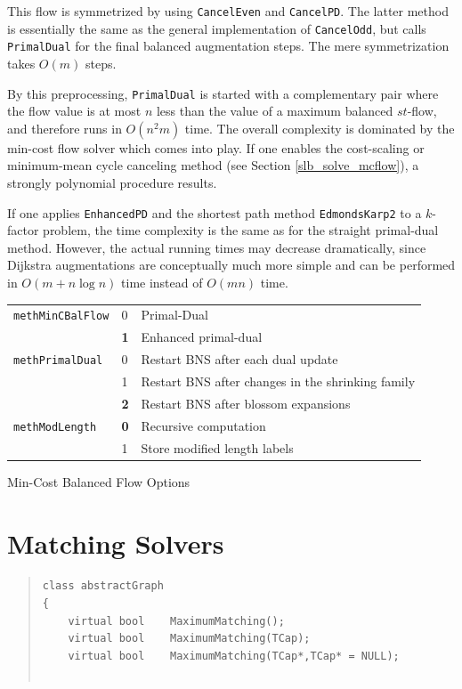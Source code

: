 \documentclass[a4paper,11pt,twoside]{book}
\begin{document}
\begin{multicols}{2}
This flow is symmetrized by using \verb/CancelEven/ and \verb/CancelPD/. The
latter method is essentially the same as the general implementation of
\verb/CancelOdd/, but calls \verb/PrimalDual/ for the final balanced
augmentation steps. The mere symmetrization takes $O(m)$ steps.

By this preprocessing, \verb/PrimalDual/ is started with a complementary pair
where the flow value is at most $n$ less than the value of a maximum balanced
$st$-flow, and therefore runs in $O(n^2m)$ time. The overall complexity is
dominated by the min-cost flow solver which comes into play. If one enables
the cost-scaling or minimum-mean cycle canceling method (see Section
\ref{slb_solve_mcflow}), a strongly polynomial procedure results.

If one applies \verb/EnhancedPD/ and the shortest path method
\verb/EdmondsKarp2/ to a $k$-factor problem, the time complexity
is the same as for the straight primal-dual method. However, the actual running
times may decrease dramatically, since Dijkstra augmentations are
conceptually much more simple and can be performed in $O(m+n\log{n})$ time
instead of $O(mn)$ time.

\begin{tablehere}
\begin{center}
\vspace*{1cm}
\begin{tabular}{|l|l|l|}
\hline
\verb/methMinCBalFlow/& 0 & Primal-Dual \\
                    & {\bf 1} & Enhanced primal-dual \\
\hline
\verb/methPrimalDual/& 0 & Restart BNS after each dual update \\
                    & 1 & Restart BNS after changes in the shrinking family \\
                    & {\bf 2} & Restart BNS after blossom expansions \\
\hline
\verb/methModLength/& {\bf 0} & Recursive computation \\
                    & 1 & Store modified length labels \\
\hline
\end{tabular}
\end{center}
\caption{\label{tlb707}Min-Cost Balanced Flow Options}
\end{tablehere}



\section{Matching Solvers}
\label{slb_solve_matching}
\methods
\begin{quote}
\begin{verbatim}
class abstractGraph
{
    virtual bool    MaximumMatching();
    virtual bool    MaximumMatching(TCap);
    virtual bool    MaximumMatching(TCap*,TCap* = NULL);


\end{verbatim}
\end{quote}
\end{multicols}
\end{document}
